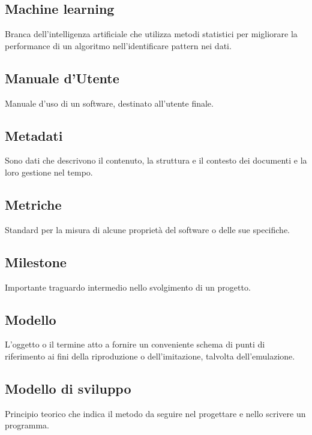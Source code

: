 \documentclass[../glossario.tex]{subfiles}
\begin{document}
\subsection*{Machine learning} 
Branca dell'intelligenza artificiale che utilizza metodi statistici per migliorare la performance di un algoritmo nell'identificare pattern nei dati.

\subsection*{Manuale d'Utente} 
Manuale d'uso di un software, destinato all'utente finale.

\subsection*{Metadati}
Sono dati che descrivono il contenuto, la struttura e il contesto dei documenti e la loro gestione nel tempo.


\subsection*{Metriche} 
Standard per la misura di alcune proprietà del software o delle sue specifiche.

\subsection*{Milestone} 
Importante traguardo intermedio nello svolgimento di un progetto.

\subsection*{Modello} 
L'oggetto o il termine atto a fornire un conveniente schema di punti di riferimento ai fini della riproduzione o dell'imitazione, talvolta dell'emulazione.

\subsection*{Modello di sviluppo} 
Principio teorico che indica il metodo da seguire nel progettare e nello scrivere un programma.

    
\end{document}
